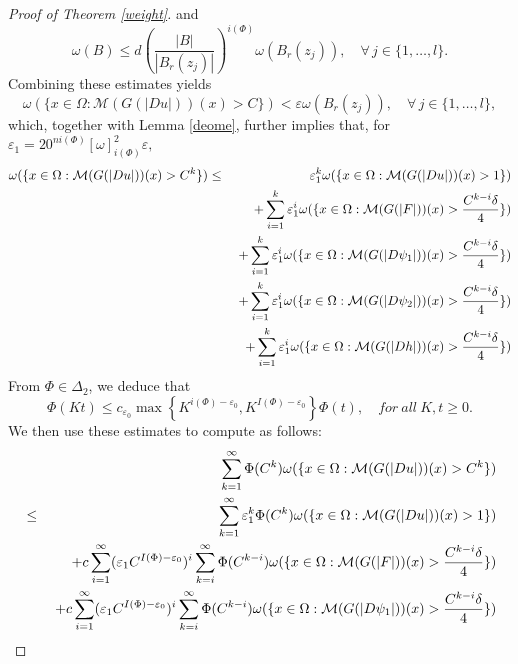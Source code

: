 \documentclass[10pt,a4paper]{article}
\theoremstyle{definition}
\numberwithin{equation}{section}
\newcommand{\ls}{\leqslant}
\begin{document}
\begin{proof}[Proof of Theorem \ref{weight}]
{and
\[
\omega(B) \leq d \left( \frac{|B|}{|B_r(z_j)|} \right)^{i(\Phi)} \omega(B_r(z_j)), \quad\forall\,
j\in\{1, \ldots, l\}.
\]
Combining these estimates yields
\[
\omega(\{x \in \Omega : \mathcal{M}(G(|Du|))(x) > C\}) < \varepsilon \omega(B_r(z_j)), \quad\forall\,
j\in\{1, \ldots, l\},
\]
which, together with Lemma \ref{deome}, further implies that, for
\(
\varepsilon_1 = 20^{ni(\Phi)}[\omega]_{i(\Phi)}^{2}\varepsilon,
\)
\begin{eqnarray*}
 \omega(\{x \in \Omega : \mathcal{M}(G(|Du|))(x) > C^k\}) &\leq& \varepsilon_1^k \omega(\{x \in \Omega : \mathcal{M}(G(|Du|))(x) > 1\})  \\
&&\hspace{0.1cm}+ \sum_{i=1}^k \varepsilon_1^i \omega(\{x \in \Omega : \mathcal{M}(G(|F|))(x) > \frac{C^{k-i} \delta}{4}\}) \\
&&\hspace{0.1cm}+ \sum_{i=1}^k \varepsilon_1^i \omega(\{x \in \Omega : \mathcal{M}(G(|D\psi_1|))(x) > \frac{C^{k-i} \delta}{4}\})
\\
&&\hspace{0.1cm}+ \sum_{i=1}^k \varepsilon_1^i \omega(\{x \in \Omega : \mathcal{M}(G(|D\psi_2|))(x) > \frac{C^{k-i} \delta}{4}\})
\\
&&\hspace{0.1cm}+ \sum_{i=1}^k \varepsilon_1^i \omega(\{x \in \Omega : \mathcal{M}(G(|Dh|))(x) > \frac{C^{k-i} \delta}{4}\})
\end{eqnarray*}
From $\Phi \in \Delta_2$, we deduce that
$$\Phi(Kt)\ls c_{\varepsilon_0} \max\left\lbrace K^{i(\Phi)-\varepsilon_0}, K^{I(\Phi)-\varepsilon_0}\right\rbrace\Phi(t), \quad for \ all \ K,t\geqslant0. $$
We then use these estimates to compute as follows:
\begin{eqnarray*}
&&\sum_{k=1}^\infty \Phi(C^k) \omega(\{x \in \Omega : \mathcal{M}(G(|Du|))(x) > C^k\}) \\
& \leq& \sum_{k=1}^\infty \varepsilon_1^k \Phi(C^k) \omega(\{x \in \Omega : \mathcal{M}(G(|Du|))(x) > 1\}) \\
&&\hspace{0.1cm}+ c \sum_{i=1}^{\infty} (\varepsilon_1 C^{I(\Phi) - \varepsilon_0})^i \sum_{k=i}^{\infty} \Phi(C^{k-i}) \omega(\{x \in \Omega : \mathcal{M}(G(|F|))(x) > \frac{C^{k-i} \delta}{4}\}) \\
&&\hspace{0.1cm}+ c \sum_{i=1}^{\infty} (\varepsilon_1 C^{I(\Phi) - \varepsilon_0})^i \sum_{k=i}^{\infty} \Phi(C^{k-i}) \omega(\{x \in \Omega : \mathcal{M}(G(|D\psi_1|))(x) > \frac{C^{k-i} \delta}{4}\}) \\

\end{eqnarray*}}
\end{proof}
\end{document}
